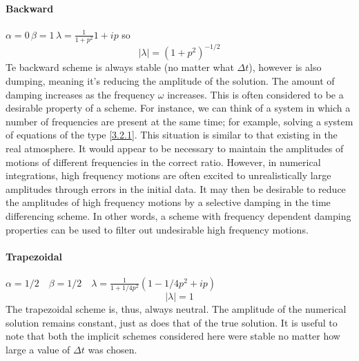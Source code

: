 \paragraph{Backward} $\alpha=0 \, \beta=1 \, \lambda=\frac{1}{1+p^2}1+ip$
so $$|\lambda|=(1+p^2)^{-1/2}$$
Te backward scheme is always stable (no matter what $\Delta t$), however is also dumping, meaning it's reducing the amplitude of the solution. The amount of damping increases as the frequency $\omega$ increases. This is often considered to be a desirable property of a scheme. For instance, we can think of a system in which a number of frequencies are present at the same time; for example, solving a system of equations of the type \ref{3.2.1}. This situation is similar to that existing in the real atmosphere. It would appear to be necessary to maintain the amplitudes of motions of different frequencies in the correct ratio. However, in numerical integrations, high frequency motions are often excited to unrealistically large amplitudes through errors in the initial data. It may then be desirable to reduce the amplitudes of high frequency motions by a selective damping in the time differencing scheme. In other words, a scheme with frequency dependent damping properties can be used to filter out undesirable high frequency motions.
\paragraph{Trapezoidal} $\alpha=1/2 \quad \beta=1/2 \quad \lambda=\frac{1}{1+1/4p^2}\left(1-1/4p^2+ip\right)$
$$|\lambda|=1$$
The trapezoidal scheme is, thus, always neutral. The amplitude of the numerical solution remains constant, just as does that of the true solution. It is useful to note that both the implicit schemes considered here were stable no matter how large a value of $\Delta t$ was chosen.
